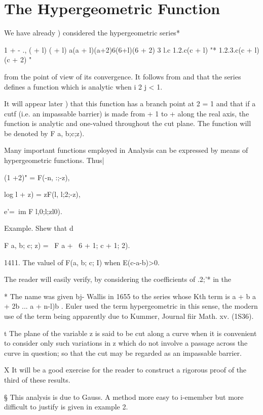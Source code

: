 %
%
\chapter{The Hypergeometric Function}


We have already ) considered the hypergeometric series*

1 + - ., ( + l) ( + l) a(a + l)(a+2)6(6+l)(6 + 2) 3 l.c 1.2.c(c + l)
"* 1.2.3.c(c + l)(c + 2) "

from the point of view of its convergence. It follows from and that the series defines a function which is analytic when i 2 j
< 1.

It will appear later ) that this function has a branch point
at 2 = 1 and that if a cutf (i.e. an impassable barrier) is made from
+ 1 to + along the real axis, the function is analytic and one-valued
throughout the cut plane. The function will be denoted by F a, b;c;z).

Many important functions employed in Analysis can be expressed by
means of hypergeometric functions. Thus|

(1 +2)" = F(-n, :;-z),

log l + z) = zF(l, l;2;-z),

e'=\ im F l,0;l;zl0).

Example. Shew that d

F a, b; c; z) = ~F a + \, 6 + 1; c + 1; 2).

1411. The valuel of F(a, b; c; I) when E(c-a-b)>0.

The reader will easily verify, by considering the coefficients of
.2;'* in the

* The name was given bj- Wallis in 1655 to the series whose Kth term
is a + b a + 2b ... a + n-l)b . Euler used the term hypergeometric in
this sense, the modern use of the term being apparently due to Kummer,
Journal fiir Math. xv. (1S36).

t The plane of the variable z is said to be cut along a curve when it
is convenient to consider only such variations in z which do not
involve a passage across the curve in question; so that the cut may
be regarded as an impassable barrier.

X It will be a good exercise for the reader to construct a rigorous
proof of the third of these results.

§ This analysis is due to Gauss. A method more easy to i-emember but
more difficult to justify is given in example 2.


